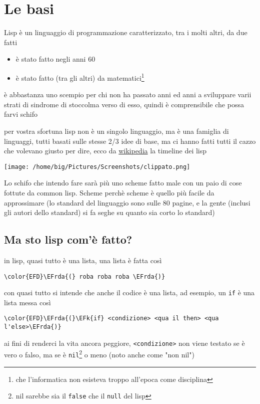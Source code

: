 \documentclass[11pt]{article}
\author{Biggie Dickus}
\date{\today}
\title{}
\newcommand{\EFk}[1]{\textcolor{EFk}{#1}} %
\newcommand{\EFrda}[1]{\textcolor{EFrda}{#1}} %
\begin{document}
\tableofcontents

\section{Le basi}
\label{sec:orgbe6922f}
Lisp è un linguaggio di programmazione caratterizzato, tra i molti altri, da due fatti
\begin{itemize}
\item è stato fatto negli anni 60
\item è stato fatto (tra gli altri) da matematici\footnote{che l'informatica non esisteva troppo all'epoca come disciplina}
\end{itemize}

è abbastanza uno scempio per chi non ha passato anni ed anni a sviluppare varii strati di sindrome di stoccolma verso di esso, quindi è comprensibile che possa farvi schifo

per vostra sfortuna lisp non è un singolo linguaggio, ma è una famiglia di linguaggi, tutti basati sulle stesse 2/3 idee di base, ma ci hanno fatti tutti il cazzo che volevano
giusto per dire, ecco da \href{https://en.wikipedia.org/wiki/Lisp\_(programming\_language)}{wikipedia} la timeline dei lisp

\begin{center}
\texttt{[image: /home/big/Pictures/Screenshots/clippato.png]}
\end{center}

Lo schifo che intendo fare sarà più uno scheme fatto male con un paio di cose fottute da common lisp.
Scheme perchè scheme è quello più facile da approssimare (lo standard del linguaggio sono sulle 80 pagine, e la gente (inclusi gli autori dello standard) si fa seghe su quanto sia corto lo standard)

\subsection{Ma sto lisp com'è fatto?}
\label{sec:org5e935bb}
in lisp, quasi tutto è una lista, una lista è fatta così
\begin{Code}
\begin{Verbatim}
\color{EFD}\EFrda{(} roba roba roba \EFrda{)}
\end{Verbatim}
\end{Code}

con quasi tutto si intende che anche il codice è una lista, ad esempio, un \texttt{if} è una lista messa così
\begin{Code}
\begin{Verbatim}
\color{EFD}\EFrda{(}\EFk{if} <condizione> <qua il then> <qua l'else>\EFrda{)}
\end{Verbatim}
\end{Code}
ai fini di renderci la vita ancora peggiore, \texttt{<condizione>} non viene testato se è vero o falso, ma se è \texttt{nil}\footnote{nil sarebbe sia il \texttt{false} che il \texttt{null} del lisp} o meno (noto anche come "non nil")
\end{document}
